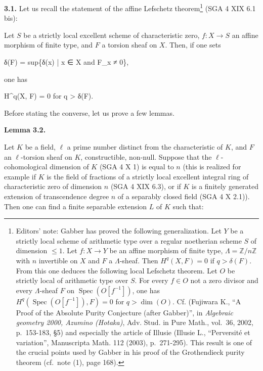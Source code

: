 \documentclass[
]{article}
\newenvironment{Shaded}{}{}
\newcommand{\NormalTok}[1]{#1}
\begin{document}
\textbf{3.1.} Let us recall the statement of the affine Lefschetz
theorem\footnote{Editors' note: Gabber has proved the following
  generalization. Let \(Y\) be a strictly local scheme of arithmetic
  type over a regular noetherian scheme \(S\) of dimension
  \(\leqslant 1\). Let \(f : X \to Y\) be an affine morphism of finite
  type, \(\Lambda = \mathbb{Z}/n\mathbb{Z}\) with \(n\) invertible on
  \(X\) and \(F\) a \(\Lambda\)-sheaf. Then \(H^{q}(X, F) = 0\) if
  \(q > \delta(F)\). From this one deduces the following local Lefschetz
  theorem. Let \(O\) be strictly local of arithmetic type over \(S\).
  For every \(f \in O\) not a zero divisor and every \(\Lambda\)-sheaf
  \(F\) on \(\operatorname{Spec}(O[f^{-1}])\), one has
  \(H^{q}(\operatorname{Spec}(O[f^{-1}]), F) = 0\) for \(q > \dim(O)\).
  Cf. (Fujiwara K., ``A Proof of the Absolute Purity Conjecture (after
  Gabber)'', in \emph{Algebraic geometry 2000, Azumino (Hotaka)}, Adv.
  Stud. in Pure Math., vol.~36, 2002, p.~153-183, §5) and especially the
  article of Illusie (Illusie L., ``Perversité et variation'',
  Manuscripta Math. 112 (2003), p.~271-295). This result is one of the
  crucial points used by Gabber in his proof of the Grothendieck purity
  theorem (cf.~note (1), page 168).} (SGA 4 XIX 6.1 bis):

Let \(S\) be a strictly local excellent scheme of characteristic zero,
\(f : X \to S\) an affine morphism of finite type, and \(F\) a torsion
sheaf on \(X\). Then, if one sets

\begin{Shaded}
\begin{Highlighting}[]
\NormalTok{δ(F) = sup\{δ(x) | x ∈ X and F\_x ≠ 0\},}
\end{Highlighting}
\end{Shaded}

one has

\begin{Shaded}
\begin{Highlighting}[]
\NormalTok{H\^{}q(X, F) = 0 for q \textgreater{} δ(F).}
\end{Highlighting}
\end{Shaded}

Before stating the converse, let us prove a few lemmas.

\textbf{Lemma 3.2.}

Let \(K\) be a field, \(\ell\) a prime number distinct from the
characteristic of \(K\), and \(F\) an \(\ell\)-torsion sheaf on \(K\),
constructible, non-null. Suppose that the \(\ell\)-cohomological
dimension of \(K\) (SGA 4 X 1) is equal to \(n\) (this is realized for
example if \(K\) is the field of fractions of a strictly local excellent
integral ring of characteristic zero of dimension \(n\) (SGA 4 XIX 6.3),
or if \(K\) is a finitely generated extension of transcendence degree
\(n\) of a separably closed field (SGA 4 X 2.1)). Then one can find a
finite separable extension \(L\) of \(K\) such that:
\end{document}
